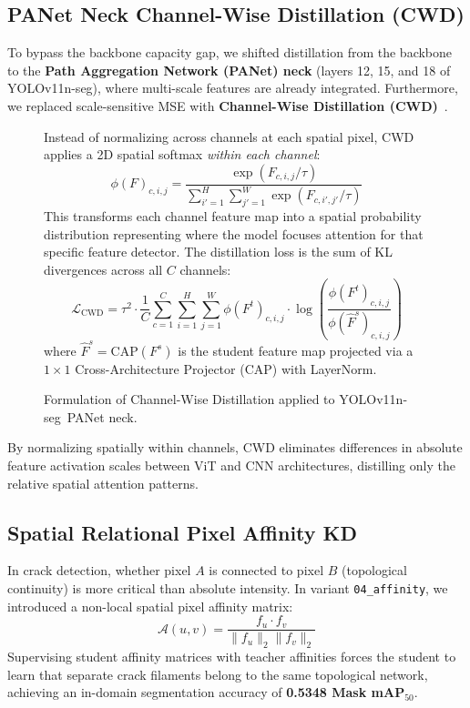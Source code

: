 \documentclass[11pt,a4paper]{article}
\newcommand{\yolo}{YOLOv11n-seg}
\begin{document}
\subsection{PANet Neck Channel-Wise Distillation (CWD)}
To bypass the backbone capacity gap, we shifted distillation from the backbone to the \textbf{Path Aggregation Network (PANet) neck} (layers 12, 15, and 18 of \yolo), where multi-scale features are already integrated. 
Furthermore, we replaced scale-sensitive MSE with \textbf{Channel-Wise Distillation (CWD)}~\cite{shu2021cwd}.

\begin{figure}[H]
\centering
\begin{tcolorbox}[colback=boxbg,colframe=boxframe,arc=2mm,title=\textbf{Mathematical Formulation: Channel-Wise Distillation (CWD)}]
Instead of normalizing across channels at each spatial pixel, CWD applies a 2D spatial softmax \emph{within each channel}:
\begin{equation}
  \phi(F)_{c,i,j} = \frac{\exp\left( F_{c,i,j} / \tau \right)}{\sum_{i'=1}^H \sum_{j'=1}^W \exp\left( F_{c,i',j'} / \tau \right)}
\end{equation}
This transforms each channel feature map into a spatial probability distribution representing where the model focuses attention for that specific feature detector.
The distillation loss is the sum of KL divergences across all $C$ channels:
\begin{equation}
  \mathcal{L}_{\text{CWD}} = \tau^2 \cdot \frac{1}{C} \sum_{c=1}^C \sum_{i=1}^H \sum_{j=1}^W \phi(F^t)_{c,i,j} \cdot \log\left( \frac{\phi(F^t)_{c,i,j}}{\phi(\hat{F}^s)_{c,i,j}} \right)
\end{equation}
where $\hat{F}^s = \text{CAP}(F^s)$ is the student feature map projected via a $1\times1$ Cross-Architecture Projector (CAP) with LayerNorm.
\end{tcolorbox}
\caption{Formulation of Channel-Wise Distillation applied to \yolo\ PANet neck.}
\label{fig:cwd}
\end{figure}

By normalizing spatially within channels, CWD eliminates differences in absolute feature activation scales between ViT and CNN architectures, distilling only the relative spatial attention patterns.

\subsection{Spatial Relational Pixel Affinity KD}
In crack detection, whether pixel $A$ is connected to pixel $B$ (topological continuity) is more critical than absolute intensity. 
In variant \texttt{04\_affinity}, we introduced a non-local spatial pixel affinity matrix:
\begin{equation}
  \mathcal{A}(u, v) = \frac{f_u \cdot f_v}{\|f_u\|_2 \|f_v\|_2}
\end{equation}
Supervising student affinity matrices with teacher affinities forces the student to learn that separate crack filaments belong to the same topological network, achieving an in-domain segmentation accuracy of \textbf{0.5348 Mask mAP$_{50}$}.
\end{document}
